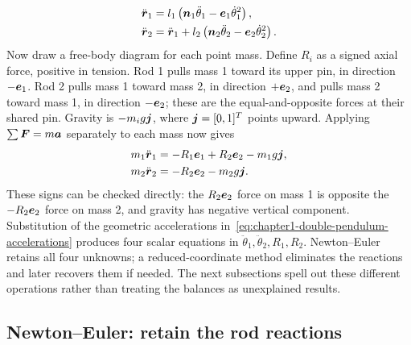 \documentclass[../main.tex]{subfiles}
\begin{document}
\begin{equation}
\begin{aligned}
\ddot{\boldsymbol{r}}_1 &= l_1\left(\boldsymbol{n}_1\ddot\theta_1-\boldsymbol{e}_1\dot\theta_1^2\right),\\
\ddot{\boldsymbol{r}}_2 &= \ddot{\boldsymbol{r}}_1+l_2\left(\boldsymbol{n}_2\ddot\theta_2-\boldsymbol{e}_2\dot\theta_2^2\right).
\end{aligned}
\label{eq:chapter1-double-pendulum-accelerations}
\end{equation}
Now draw a free-body diagram for each point mass. Define $R_i$ as a signed axial force, positive in tension. Rod 1 pulls mass 1 toward its upper pin, in direction $-\boldsymbol{e}_1$. Rod 2 pulls mass 1 toward mass 2, in direction $+\boldsymbol{e}_2$, and pulls mass 2 toward mass 1, in direction $-\boldsymbol{e}_2$; these are the equal-and-opposite forces at their shared pin. Gravity is $-m_i g\boldsymbol{j}$, where $\boldsymbol{j}=[0,1]^T$ points upward. Applying $\sum\boldsymbol{F}=m\boldsymbol{a}$ separately to each mass now gives
\begin{equation}
\begin{aligned}
m_1\ddot{\boldsymbol{r}}_1 &= -R_1\boldsymbol{e}_1+R_2\boldsymbol{e}_2-m_1g\boldsymbol{j},\\
m_2\ddot{\boldsymbol{r}}_2 &= -R_2\boldsymbol{e}_2-m_2g\boldsymbol{j}.
\end{aligned}
\label{eq:chapter1-derived-body-balances}
\end{equation}
These signs can be checked directly: the $R_2\boldsymbol{e}_2$ force on mass 1 is opposite the $-R_2\boldsymbol{e}_2$ force on mass 2, and gravity has negative vertical component. Substitution of the geometric accelerations in~\eqref{eq:chapter1-double-pendulum-accelerations} produces four scalar equations in $\ddot\theta_1,\ddot\theta_2,R_1,R_2$. Newton--Euler retains all four unknowns; a reduced-coordinate method eliminates the reactions and later recovers them if needed. The next subsections spell out these different operations rather than treating the balances as unexplained results.

\subsection{Newton--Euler: retain the rod reactions}
\end{document}
